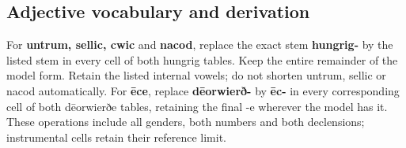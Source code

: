 \subsection*{Adjective vocabulary and derivation}

For \textbf{untrum, sellic, cwic} and \textbf{nacod}, replace the exact stem \textbf{hungrig-} by the listed stem in every cell of both hungrig tables. Keep the entire remainder of the model form. Retain the listed internal vowels; do not shorten untrum, sellic or nacod automatically. For \textbf{ēce}, replace \textbf{dēorwierð-} by \textbf{ēc-} in every corresponding cell of both dēorwierðe tables, retaining the final -e wherever the model has it. These operations include all genders, both numbers and both declensions; instrumental cells retain their reference limit.

